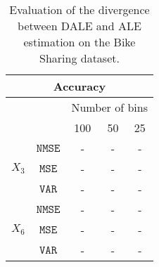 \begin{table}
  \centering
  \begin{tabular}{c|c|c|c|c}
    \multicolumn{5}{c}{Accuracy} \\
    \hline \hline
    & & \multicolumn{3}{|c}{Number of bins} \\
    \hline
    & & 100 & 50 & 25 \\
    \hline
    \hline
    \multirow{3}{*}{\(X_3\)} & \(\mathtt{NMSE}\) & - & - & - \\
    & \(\mathtt{MSE}\) & - & - & - \\
    & \(\mathtt{VAR}\) & - & - & - \\
    \hline
    \multirow{3}{*}{\(X_6\)} & \(\mathtt{NMSE}\) & - & - & - \\
    & \(\mathtt{MSE}\) & - & - & - \\
    & \(\mathtt{VAR}\) & - & - & - \\
    \hline
  \end{tabular}
  \caption{Evaluation of the divergence between DALE and ALE
    estimation on the Bike Sharing dataset.}
  \label{tab:bike-sharing-accuracy}
\end{table}



